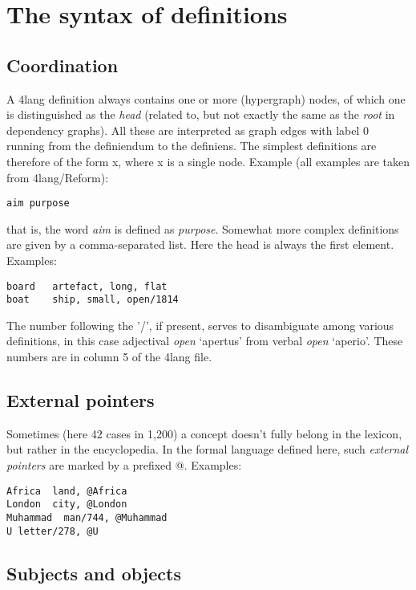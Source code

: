 \documentclass[11pt,bookmarks,bookmarksnumbered,naturalnames,plainpages=false,pdftex,colorlinks=true,urlcolor=blue,bookmarksdepth=subsection,plainpages=false]{paper}
\begin{document}
\section{The syntax of definitions}\label{8thcol}

\subsection{Coordination}\label{comma}

A 4lang definition always contains one or more (hypergraph) nodes, of which
one is distinguished as the {\it head} (related to, but not exactly the same
as the {\it root} in dependency graphs). All these are interpreted as graph
edges with label 0 running from the definiendum to the definiens.  The simplest
definitions are therefore of the form x, where x is a single node. Example
(all examples are taken from 4lang/Reform):

\noindent
{\tt aim   purpose}

\noindent
that is, the word {\it aim} is defined as {\it purpose}. Somewhat more complex
definitions are given by a comma-separated list. Here the head is always the
first element. Examples:

\begin{verbatim}
board   artefact, long, flat    
boat    ship, small, open/1814  
\end{verbatim}

The number following the '/', if present, serves to disambiguate among various
definitions, in this case adjectival {\it open} `apertus' from verbal
{\it open} `aperio'. These numbers are in column 5 of the 4lang file. 

\subsection{External pointers}\label{atsign}

Sometimes (here 42 cases in 1,200) a concept doesn't fully belong in the
lexicon, but rather in the encyclopedia. In the formal language defined here,
such {\it external pointers} are marked by a prefixed @. Examples:

\begin{verbatim}
Africa	land, @Africa	
London	city, @London	
Muhammad  man/744, @Muhammad	
U letter/278, @U
\end{verbatim}

\subsection{Subjects and objects}\label{subjobj}
\end{document}
